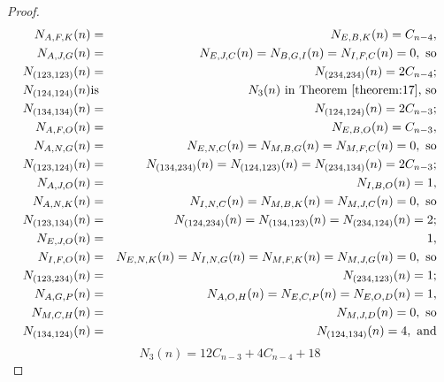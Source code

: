 \documentclass[
final,nomarks
]{dmtcs-episciences}
\newcommand{\tref}[1]{Theorem \ref{theorem:#1}}
\begin{document}
\begin{proof}
\begin{eqnarray}
		N_{A,F,K}(n)&=&N_{E,B,K}(n)=C_{n-4},\\ N_{A,J,G}(n)&=&N_{E,J,C}(n)=N_{B,G,I}(n)=N_{I,F,C}(n)=0,\ \textnormal{so}\\
		N_{(123,123)}(n)&=&N_{(234,234)}(n)=2C_{n-4};\\\nonumber
		N_{(124,124)}(n)&\textnormal{is}&N_3(n)\textnormal{ in \tref{17}, so}\\
		N_{(134,134)}(n)&=&N_{(124,124)}(n)=2C_{n-3};\\
		N_{A,F,O}(n)&=&N_{E,B,O}(n)=C_{n-3},\\ N_{A,N,G}(n)&=&N_{E,N,C}(n)=N_{M,B,G}(n)=N_{M,F,C}(n)=0,\ \textnormal{so}\\
		N_{(123,124)}(n)&=&N_{(134,234)}(n)=N_{(124,123)}(n)=N_{(234,134)}(n)=2C_{n-3};\\
		N_{A,J,O}(n)&=&N_{I,B,O}(n)=1, \\N_{A,N,K}(n)&=&N_{I,N,C}(n)=N_{M,B,K}(n)=N_{M,J,C}(n)=0,\ \textnormal{so}\\
		N_{(123,134)}(n)&=&N_{(124,234)}(n)=N_{(134,123)}(n)=N_{(234,124)}(n)=2;\\
		N_{E,J,O}(n)&=&1, \\N_{I,F,O}(n)&=&N_{E,N,K}(n)=N_{I,N,G}(n)=N_{M,F,K}(n)=N_{M,J,G}(n)=0,\ \textnormal{so}\\
		N_{(123,234)}(n)&=&N_{(234,123)}(n)=1;\\
		N_{A,G,P}(n)&=&N_{A,O,H}(n)=N_{E,C,P}(n)=N_{E,O,D}(n)=1, \\N_{M,C,H}(n)&=&N_{M,J,D}(n)=0,\ \textnormal{so}\\
		N_{(134,124)}(n)&=&N_{(124,134)}(n)=4,\textnormal{ and}
	\end{eqnarray}
	\begin{equation}
	N_3(n)=12C_{n-3}+4C_{n-4}+18
	\end{equation}
	

\end{proof}
\end{document}

